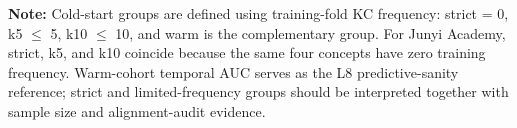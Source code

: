 \begin{table}[tbp]
{\begin{tabular}{lllcrcccccc}
\end{tabular}%
}

\vspace{1ex}
{\scriptsize \textbf{Note:} Cold-start groups are defined using training-fold KC frequency: strict = 0, k5 $\le$ 5, k10 $\le$ 10, and warm is the complementary group. For Junyi Academy, strict, k5, and k10 coincide because the same four concepts have zero training frequency. Warm-cohort temporal AUC serves as the L8 predictive-sanity reference; strict and limited-frequency groups should be interpreted together with sample size and alignment-audit evidence.\par}

\end{table}
